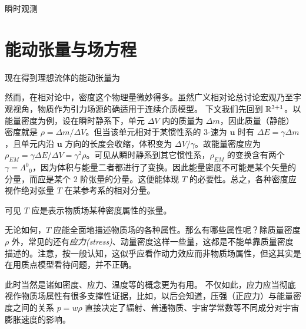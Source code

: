 瞬时观测

\section{能动张量与场方程}

现在得到理想流体的能动张量为

然而，在相对论中，密度这个物理量微妙得多。虽然广义相对论总讨论宏观乃至宇观视角，物质作为引力场源的确适用于连续介质模型。
下文我们先回到 $\mathbb{R}^{3+1}$。以能量密度为例，设在瞬时静系下，单元 $\Delta V$ 内的质量为 $\Delta m$，因此质量（静能）密度就是 $\rho=\Delta m/\Delta V$。但当该单元相对于某惯性系的 3-速为 $\bm{u}$ 时有 $\Delta E=\gamma \Delta m$，且单元内沿 $\bm u$ 方向的长度会收缩，体积变为 $\Delta V/\gamma$。故能量密度应为 $\rho_{EM}=\gamma\Delta E/\Delta V=\gamma^2\rho$。可见从瞬时静系到其它惯性系，$\rho_{EM}$ 的变换含有两个 $\gamma=\Lambda^0{}_{0}$，因为体积与能量二者都进行了变换。因此能量密度不可能是某个矢量的分量，而应是某个 2 阶张量的分量。这便能体现 $T$ 的必要性。总之，各种密度应视作绝对张量 $T$ 在某参考系的相对分量。

可见 $T$ 应是表示物质场某种密度属性的张量。

无论如何，$T$ 应能全面地描述物质场的各种属性。那么有哪些属性呢？除质量密度 $\rho$ 外，常见的还有\textit{应力(stress)}、动量密度这样一些量，这都是不能单靠质量密度描述的。注意，按一般认知，这似乎应看作动力效应而非物质场属性，但这其实是在用质点模型看待问题，并不正确。

此时当然是诸如密度、应力、温度等的概念更为有用。
不仅如此，应力应当彻底视作物质场属性有很多支撑性证据，比如，以后会知道，压强（正应力）与能量密度之间的关系 $p=w\rho$ 直接决定了辐射、普通物质、宇宙学常数等不同成分对宇宙膨胀速度的影响。
 



